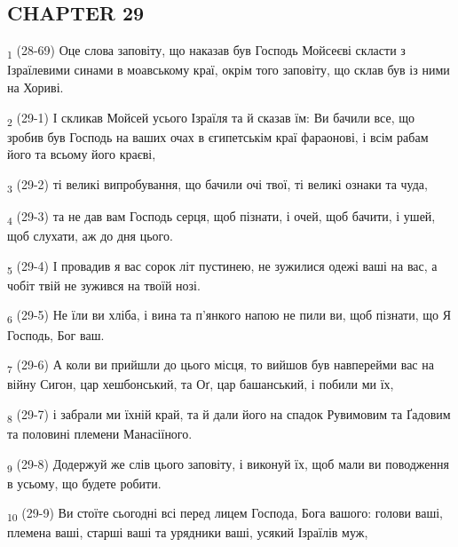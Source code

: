 \subsection{CHAPTER 29}
\begin{tcolorbox}
\textsubscript{1} (28-69) Оце слова заповіту, що наказав був Господь Мойсеєві скласти з Ізраїлевими синами в моавському краї, окрім того заповіту, що склав був із ними на Хориві.
\end{tcolorbox}
\begin{tcolorbox}
\textsubscript{2} (29-1) І скликав Мойсей усього Ізраїля та й сказав їм: Ви бачили все, що зробив був Господь на ваших очах в єгипетськім краї фараонові, і всім рабам його та всьому його краєві,
\end{tcolorbox}
\begin{tcolorbox}
\textsubscript{3} (29-2) ті великі випробування, що бачили очі твої, ті великі ознаки та чуда,
\end{tcolorbox}
\begin{tcolorbox}
\textsubscript{4} (29-3) та не дав вам Господь серця, щоб пізнати, і очей, щоб бачити, і ушей, щоб слухати, аж до дня цього.
\end{tcolorbox}
\begin{tcolorbox}
\textsubscript{5} (29-4) І провадив я вас сорок літ пустинею, не зужилися одежі ваші на вас, а чобіт твій не зужився на твоїй нозі.
\end{tcolorbox}
\begin{tcolorbox}
\textsubscript{6} (29-5) Не їли ви хліба, і вина та п'янкого напою не пили ви, щоб пізнати, що Я Господь, Бог ваш.
\end{tcolorbox}
\begin{tcolorbox}
\textsubscript{7} (29-6) А коли ви прийшли до цього місця, то вийшов був навперейми вас на війну Сигон, цар хешбонський, та Оґ, цар башанський, і побили ми їх,
\end{tcolorbox}
\begin{tcolorbox}
\textsubscript{8} (29-7) і забрали ми їхній край, та й дали його на спадок Рувимовим та Ґадовим та половині племени Манасіїного.
\end{tcolorbox}
\begin{tcolorbox}
\textsubscript{9} (29-8) Додержуй же слів цього заповіту, і виконуй їх, щоб мали ви поводження в усьому, що будете робити.
\end{tcolorbox}
\begin{tcolorbox}
\textsubscript{10} (29-9) Ви стоїте сьогодні всі перед лицем Господа, Бога вашого: голови ваші, племена ваші, старші ваші та урядники ваші, усякий Ізраїлів муж,
\end{tcolorbox}

